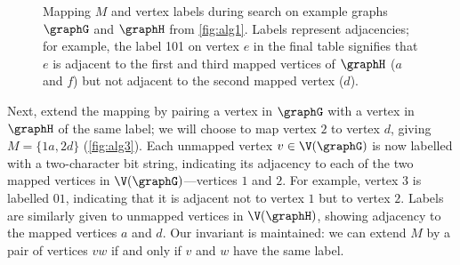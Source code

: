 \begin{figure}[htb]
    \centering
    \par\bigskip
    \par\bigskip

    \caption{Mapping $M$ and vertex labels during search on example graphs $\graphG$ and
    $\graphH$ from \cref{fig:alg1}.  Labels represent adjacencies; for example, the label
    101 on vertex $e$ in the final table signifies that $e$ is adjacent to the first
    and third mapped vertices of $\graphH$ ($a$ and $f$) but not adjacent to the second
    mapped vertex ($d$).}
    \label{figure:mcsplit-examples}
\end{figure}

Next, extend the mapping by pairing a vertex in $\graphG$ with a vertex in $\graphH$ of the
same label; we will choose to map vertex $2$ to vertex $d$, giving $M=\{1a,
2d\}$ (\cref{fig:alg3}).  Each unmapped vertex $v \in \V(\graphG)$ is now labelled
with a two-character bit string, indicating its adjacency to each of
the two mapped vertices in $\V(\graphG)$---vertices $1$ and $2$.  For example, vertex
$3$ is labelled $01$, indicating that it is adjacent not to vertex $1$ but
to vertex $2$.  Labels are similarly given to unmapped vertices in $\V(\graphH)$,
showing adjacency to the mapped vertices $a$ and $d$.  Our invariant is
maintained: we can extend $M$ by a pair of vertices $vw$ if and only if $v$ and $w$
have the same label.

